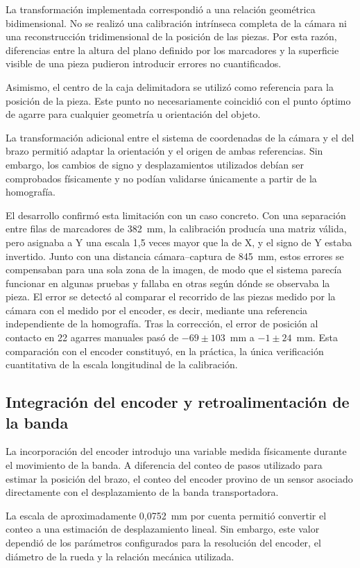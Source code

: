 La transformación implementada correspondió a una relación geométrica bidimensional. No se realizó una calibración intrínseca completa de la cámara ni una reconstrucción tridimensional de la posición de las piezas. Por esta razón, diferencias entre la altura del plano definido por los marcadores y la superficie visible de una pieza pudieron introducir errores no cuantificados.

Asimismo, el centro de la caja delimitadora se utilizó como referencia para la posición de la pieza. Este punto no necesariamente coincidió con el punto óptimo de agarre para cualquier geometría u orientación del objeto.

La transformación adicional entre el sistema de coordenadas de la cámara y el del brazo permitió adaptar la orientación y el origen de ambas referencias. Sin embargo, los cambios de signo y desplazamientos utilizados debían ser comprobados físicamente y no podían validarse únicamente a partir de la homografía.

El desarrollo confirmó esta limitación con un caso concreto. Con una separación entre filas de marcadores de 382~mm, la calibración producía una matriz válida, pero asignaba a Y una escala 1,5 veces mayor que la de X, y el signo de Y estaba invertido. Junto con una distancia cámara--captura de 845~mm, estos errores se compensaban para una sola zona de la imagen, de modo que el sistema parecía funcionar en algunas pruebas y fallaba en otras según dónde se observaba la pieza. El error se detectó al comparar el recorrido de las piezas medido por la cámara con el medido por el encoder, es decir, mediante una referencia independiente de la homografía. Tras la corrección, el error de posición al contacto en 22 agarres manuales pasó de $-69\pm103$~mm a $-1\pm24$~mm. Esta comparación con el encoder constituyó, en la práctica, la única verificación cuantitativa de la escala longitudinal de la calibración.


\subsection{Integración del encoder y retroalimentación de la banda}

La incorporación del encoder introdujo una variable medida físicamente durante el movimiento de la banda. A diferencia del conteo de pasos utilizado para estimar la posición del brazo, el conteo del encoder provino de un sensor asociado directamente con el desplazamiento de la banda transportadora.

La escala de aproximadamente 0,0752~mm por cuenta permitió convertir el conteo a una estimación de desplazamiento lineal. Sin embargo, este valor dependió de los parámetros configurados para la resolución del encoder, el diámetro de la rueda y la relación mecánica utilizada.


